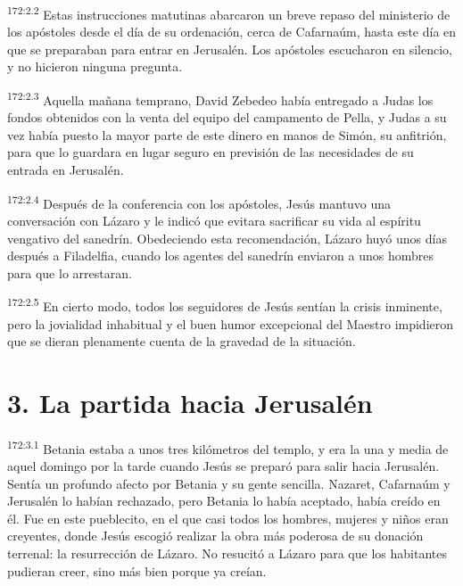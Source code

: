 \par 
\textsuperscript{172:2.2} Estas instrucciones matutinas abarcaron un breve repaso del ministerio de los apóstoles desde el día de su ordenación, cerca de Cafarnaúm, hasta este día en que se preparaban para entrar en Jerusalén. Los apóstoles escucharon en silencio, y no hicieron ninguna pregunta.

\par 
\textsuperscript{172:2.3} Aquella mañana temprano, David Zebedeo había entregado a Judas los fondos obtenidos con la venta del equipo del campamento de Pella, y Judas a su vez había puesto la mayor parte de este dinero en manos de Simón, su anfitrión, para que lo guardara en lugar seguro en previsión de las necesidades de su entrada en Jerusalén.

\par 
\textsuperscript{172:2.4} Después de la conferencia con los apóstoles, Jesús mantuvo una conversación con Lázaro y le indicó que evitara sacrificar su vida al espíritu vengativo del sanedrín. Obedeciendo esta recomendación, Lázaro huyó unos días después a Filadelfia, cuando los agentes del sanedrín enviaron a unos hombres para que lo arrestaran.

\par 
\textsuperscript{172:2.5} En cierto modo, todos los seguidores de Jesús sentían la crisis inminente, pero la jovialidad inhabitual y el buen humor excepcional del Maestro impidieron que se dieran plenamente cuenta de la gravedad de la situación.

\section*{3. La partida hacia Jerusalén}
\par 
\textsuperscript{172:3.1} Betania estaba a unos tres kilómetros del templo, y era la una y media de aquel domingo por la tarde cuando Jesús se preparó para salir hacia Jerusalén. Sentía un profundo afecto por Betania y su gente sencilla. Nazaret, Cafarnaúm y Jerusalén lo habían rechazado, pero Betania lo había aceptado, había creído en él. Fue en este pueblecito, en el que casi todos los hombres, mujeres y niños eran creyentes, donde Jesús escogió realizar la obra más poderosa de su donación terrenal: la resurrección de Lázaro. No resucitó a Lázaro para que los habitantes pudieran creer, sino más bien porque ya creían.

